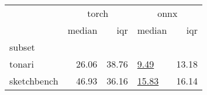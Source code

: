 \begin{tabular}{lrrlr}
\toprule
 & \multicolumn{2}{c}{torch} & \multicolumn{2}{c}{\acrshort{onnx}} \\
 & median & \acrshort{iqr} & median & \acrshort{iqr} \\
subset &  &  &  &  \\
\midrule
tonari & 26.06 & 38.76 & \underline{9.49} & 13.18 \\
sketchbench & 46.93 & 36.16 & \underline{15.83} & 16.14 \\
\bottomrule
\end{tabular}
